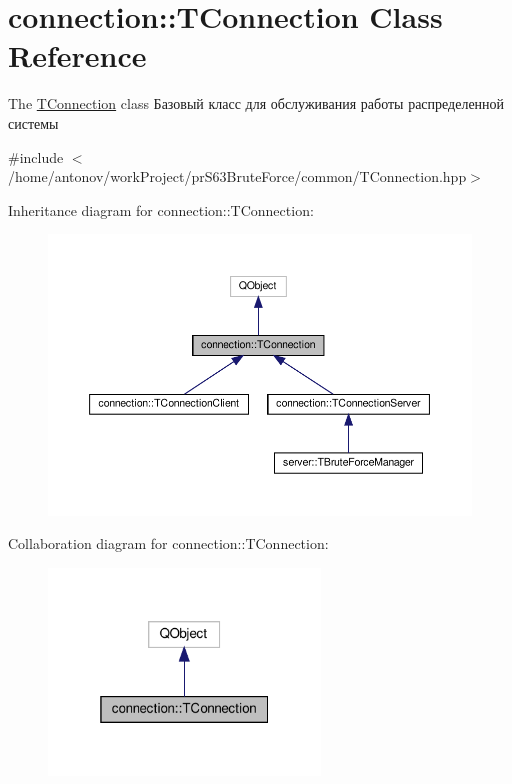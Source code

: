 \hypertarget{classconnection_1_1_t_connection}{}\section{connection\+:\+:T\+Connection Class Reference}
\label{classconnection_1_1_t_connection}


The \hyperlink{classconnection_1_1_t_connection}{T\+Connection} class Базовый класс для обслуживания работы распределенной системы  




{\ttfamily \#include $<$/home/antonov/work\+Project/pr\+S63\+Brute\+Force/common/\+T\+Connection.\+hpp$>$}



Inheritance diagram for connection\+:\+:T\+Connection\+:\nopagebreak
\begin{figure}[H]
\begin{center}
\leavevmode
\includegraphics[width=350pt]{classconnection_1_1_t_connection__inherit__graph}
\end{center}
\end{figure}


Collaboration diagram for connection\+:\+:T\+Connection\+:\nopagebreak
\begin{figure}[H]
\begin{center}
\leavevmode
\includegraphics[width=205pt]{classconnection_1_1_t_connection__coll__graph}
\end{center}
\end{figure}
